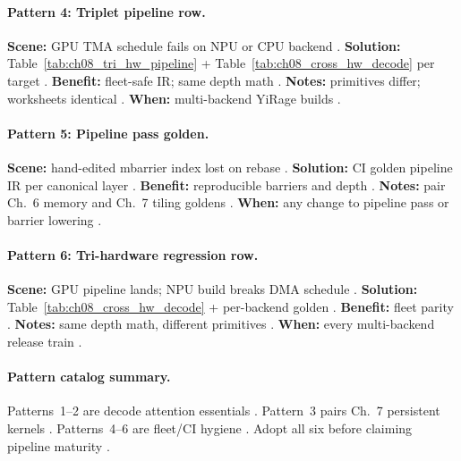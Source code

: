 \paragraph{Pattern 4: Triplet pipeline row.}
\textbf{Scene:} GPU TMA schedule fails on NPU or CPU backend \citep{amd2024xdna,taxbreak2026}.
\textbf{Solution:} Table~\ref{tab:ch08_tri_hw_pipeline} + Table~\ref{tab:ch08_cross_hw_decode} per target \citep{yirage2026,chen2020compilerbasedhardw}.
\textbf{Benefit:} fleet-safe IR; same depth math \citep{patel2025llminference,amd2024aie}.
\textbf{Notes:} primitives differ; worksheets identical \citep{nvidia2022hopper,dlbook,amd2024xdna}.
\textbf{When:} multi-backend YiRage builds \citep{wu2024mirage,yirage2026}.

\paragraph{Pattern 5: Pipeline pass golden.}
\textbf{Scene:} hand-edited mbarrier index lost on rebase \citep{shah2024flashattention3,yirage2026}.
\textbf{Solution:} CI golden pipeline IR per canonical layer \citep{wu2024mirage,chen2020compilerbasedhardw}.
\textbf{Benefit:} reproducible barriers and depth \citep{semianalysis2024tma,taxbreak2026}.
\textbf{Notes:} pair Ch.~6 memory and Ch.~7 tiling goldens \citep{yirage2026,mpk2025}.
\textbf{When:} any change to pipeline pass or barrier lowering \citep{chen2020compilerbasedhardw,shah2024flashattention3}.

\paragraph{Pattern 6: Tri-hardware regression row.}
\textbf{Scene:} GPU pipeline lands; NPU build breaks DMA schedule \citep{amd2024xdna,taxbreak2026}.
\textbf{Solution:} Table~\ref{tab:ch08_cross_hw_decode} + per-backend golden \citep{yirage2026,patel2025llminference}.
\textbf{Benefit:} fleet parity \citep{chen2020compilerbasedhardw}.
\textbf{Notes:} same depth math, different primitives \citep{amd2024aie,nvidia2022hopper}.
\textbf{When:} every multi-backend release train \citep{wu2024mirage,yirage2026,mpk2025}.

\paragraph{Pattern catalog summary.}
Patterns~1--2 are decode attention essentials \citep{dao2022flashattention,kwon2023vllm,shah2024flashattention3}.
Pattern~3 pairs Ch.~7 persistent kernels \citep{mpk2025,nvidia2024cudagraphs}.
Patterns~4--6 are fleet/CI hygiene \citep{patel2025llminference,chen2020compilerbasedhardw,taxbreak2026}.
Adopt all six before claiming pipeline maturity \citep{yirage2026,memoryfloor2026,semianalysis2024tma}.

